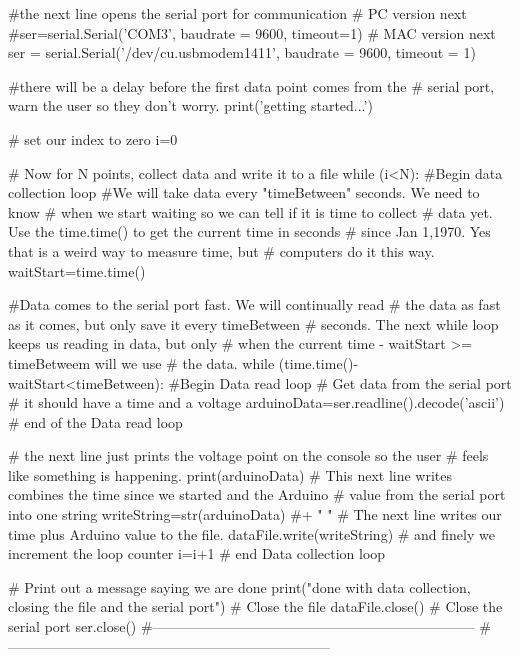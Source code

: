 \begin{python}
 
#the next line opens the serial port for communication
#  PC version next
#ser=serial.Serial('COM3', baudrate = 9600, timeout=1)
#  MAC version next
ser = serial.Serial('/dev/cu.usbmodem1411', baudrate = 9600, timeout = 1)

 
#there will be a delay before the first data point comes from the 
#  serial port, warn the user so they don't worry.
print('getting started...')
 
# set our index to zero
i=0
 
 
# Now for N points, collect data and write it to a file
while (i<N):    #Begin data collection loop
    #We will take data every "timeBetween" seconds. We need to know 
    #   when we start waiting so we can tell if it is time to collect 
    #   data yet. Use the time.time() to get the current time in seconds
    #   since Jan 1,1970. Yes that is a weird way to measure time, but 
    #   computers do it this way.
    waitStart=time.time()
    
    #Data comes to the serial port fast. We will continually read 
    #  the data as fast as it comes, but only save it every timeBetween
    #  seconds. The next while loop keeps us reading in data, but only 
    #  when the current time - waitStart >= timeBetweem will we use 
    #  the data.
    while (time.time()-waitStart<timeBetween): #Begin Data read loop
         # Get data from the serial port
         # it should have a time and a voltage
         arduinoData=ser.readline().decode('ascii')
         # end of the Data read loop
         
    # the next line just prints the voltage point on the console so the user 
    # feels like something is happening.
    print(arduinoData)
    # This next line writes combines the time since we started and the Arduino 
    # value from the serial port into one string
    writeString=str(arduinoData) #+ " \n"
    # The next line writes our time plus Arduino value to the file.
    dataFile.write(writeString)
    # and finely we increment the loop counter
    i=i+1      # end Data collection loop   
    
# Print out a message saying we are done
print("done with data collection, closing the file and the serial port")
# Close the file
dataFile.close()
# Close the serial port   
ser.close() 
#---------------------------------------------------------------------
#---------------------------------------------------------------------

\end{python}

